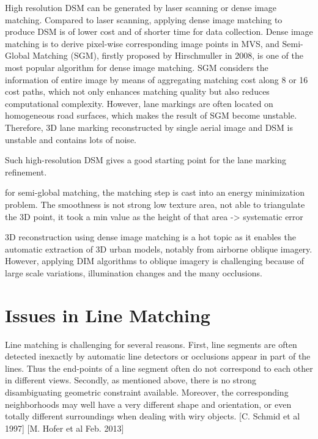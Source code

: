 High resolution DSM can be generated by laser scanning or dense image matching. Compared to laser scanning, applying dense image matching to produce DSM is of lower cost and of shorter time for data collection. Dense image matching is to derive pixel-wise corresponding image points in MVS, and Semi-Global Matching (SGM), firstly proposed by Hirschmuller in 2008, is one of the most popular algorithm for dense image matching. SGM considers the information of entire image by means of aggregating matching cost along 8 or 16 cost paths, which not only enhances matching quality but also reduces computational complexity. However, lane markings are often located on homogeneous road surfaces, which makes the result of SGM become unstable. Therefore, 3D lane marking reconstructed by single aerial image and DSM is unstable and contains lots of noise. %

Such high-resolution DSM gives a good starting point for the lane marking refinement.

for semi-global matching, the matching step is cast into an energy minimization problem.
The smoothness is not strong
low texture area, not able to triangulate the 3D point, it took a min value as the height of that area -> systematic error


3D reconstruction using dense image matching is a hot topic as it enables the automatic extraction of 3D urban models, notably from airborne oblique imagery. However, applying DIM algorithms to oblique imagery is challenging because of large scale variations, illumination changes and the many occlusions.



\section{Issues in Line Matching}

Line matching is challenging for several reasons. First, line segments are often detected inexactly by automatic line detectors or occlusions appear in part of the lines. Thus the end-points of a line segment often do not correspond to each other in different views. Secondly, as mentioned above, there is no strong disambiguating geometric constraint available. Moreover, the corresponding neighborhoods may well have a very different shape and orientation, or even totally different surroundings when dealing with wiry objects. [C. Schmid et al 1997] [M. Hofer et al Feb. 2013]



